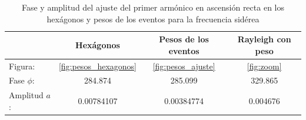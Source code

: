 \begin{table}[H]
\centering
\begin{tabular}{l|c|c|||c}
				& Hexágonos 				& Pesos	de los eventos		& Rayleigh con peso \\ \hline
Figura:			& \ref{fig:pesos_hexagonos} &\ref{fig:pesos_ajuste}		&\ref{fig:zoom} \\
Fase $\phi$:	& 284.874 	 				& 285.099					&329.865	\\
Amplitud $a$:	& 0.00784107 				&  0.00384774 				&0.004676\\
\end{tabular}
\caption{Fase y amplitud del ajuste del primer armónico en ascensión recta en los hexágonos y  pesos  de los eventos para la frecuencia sidérea}
\label{tabla:ajuste_primer_armonico}
\end{table}
